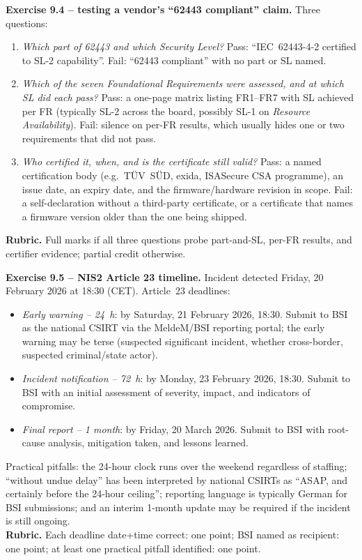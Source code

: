 \documentclass[11pt,a4paper]{article}
\begin{document}
\begin{solutionbox}
\textbf{Exercise 9.4 -- testing a vendor's ``62443 compliant'' claim.}
Three questions:
\begin{enumerate}
  \item \emph{Which part of 62443 and which Security Level?} Pass: ``IEC~62443-4-2 certified to SL-2 capability''. Fail: ``62443 compliant'' with no part or SL named.
  \item \emph{Which of the seven Foundational Requirements were assessed, and at which SL did each pass?} Pass: a one-page matrix listing FR1--FR7 with SL achieved per FR (typically SL-2 across the board, possibly SL-1 on \emph{Resource Availability}). Fail: silence on per-FR results, which usually hides one or two requirements that did not pass.
  \item \emph{Who certified it, when, and is the certificate still valid?} Pass: a named certification body (e.g.\ TÜV~SÜD, exida, ISASecure CSA programme), an issue date, an expiry date, and the firmware/hardware revision in scope. Fail: a self-declaration without a third-party certificate, or a certificate that names a firmware version older than the one being shipped.
\end{enumerate}
\textbf{Rubric.} Full marks if all three questions probe part-and-SL, per-FR results, and certifier evidence; partial credit otherwise.
\end{solutionbox}

\begin{solutionbox}
\textbf{Exercise 9.5 -- NIS2 Article 23 timeline.}
Incident detected Friday, 20 February 2026 at 18:30 (CET). Article~23 deadlines:
\begin{itemize}
  \item \emph{Early warning -- 24~h}: by Saturday, 21 February 2026, 18:30. Submit to BSI as the national CSIRT via the MeldeM/BSI reporting portal; the early warning may be terse (suspected significant incident, whether cross-border, suspected criminal/state actor).
  \item \emph{Incident notification -- 72~h}: by Monday, 23 February 2026, 18:30. Submit to BSI with an initial assessment of severity, impact, and indicators of compromise.
  \item \emph{Final report -- 1 month}: by Friday, 20 March 2026. Submit to BSI with root-cause analysis, mitigation taken, and lessons learned.
\end{itemize}
Practical pitfalls: the 24-hour clock runs over the weekend regardless of staffing; ``without undue delay'' has been interpreted by national CSIRTs as ``ASAP, and certainly before the 24-hour ceiling''; reporting language is typically German for BSI submissions; and an interim 1-month update may be required if the incident is still ongoing.
\\\textbf{Rubric.} Each deadline date+time correct: one point; BSI named as recipient: one point; at least one practical pitfall identified: one point.
\end{solutionbox}
\end{document}
